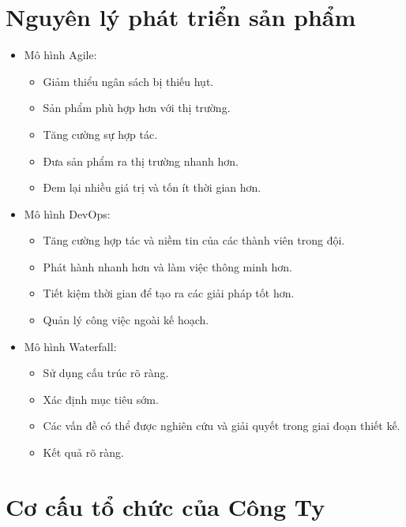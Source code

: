 \documentclass[12pt,a4paper]{report}
\begin{document}
	\section{Nguyên lý phát triển sản phẩm}
	\begin{itemize}
		\item Mô hình Agile:
			\begin{itemize}
				\item Giảm thiểu ngân sách bị thiếu hụt.
				\item Sản phẩm phù hợp hơn với thị trường.
				\item Tăng cường sự hợp tác.
				\item Đưa sản phẩm ra thị trường nhanh hơn.
				\item Đem lại nhiều giá trị và tốn ít thời gian hơn.
			\end{itemize}
		\item Mô hình DevOps:
			\begin{itemize}
				\item Tăng cường hợp tác và niềm tin của các thành viên trong đội.
				\item Phát hành nhanh hơn và làm việc thông minh hơn.
				\item Tiết kiệm thời gian để tạo ra các giải pháp tốt hơn.
				\item Quản lý công việc ngoài kế hoạch.
			\end{itemize}
		\item Mô hình Waterfall:
			\begin{itemize}
				\item Sử dụng cấu trúc rõ ràng.
				\item Xác định mục tiêu sớm.
				\item Các vấn đề có thể được nghiên cứu và giải quyết trong giai đoạn thiết kế.
				\item Kết quả rõ ràng.
			\end{itemize}
	\end{itemize}

	\section{Cơ cấu tổ chức của Công Ty}
	
\end{document}
